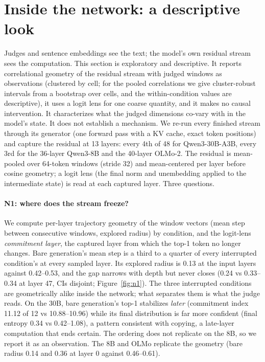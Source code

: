 \section{Inside the network: a descriptive look}
\label{sec:network}

Judges and sentence embeddings see the text; the model's own residual stream
sees the computation. This section is exploratory and descriptive. It
reports correlational geometry of the residual stream with judged windows as
observations (clustered by cell; for the pooled correlations we give
cluster-robust intervals from a bootstrap over cells, and the
within-condition values are descriptive), it uses a logit lens for one
coarse quantity, and it makes no causal intervention. It characterizes what
the judged dimensions co-vary with in the model's state. It does not
establish a mechanism. We re-run every finished stream through its generator
(one forward pass with a KV cache, exact token positions) and capture the
residual at 13 layers: every 4th of 48 for Qwen3-30B-A3B, every 3rd for the
36-layer Qwen3-8B and the 40-layer OLMo-2. The residual is mean-pooled over
64-token windows (stride 32) and mean-centered per layer before cosine
geometry; a logit lens (the final norm and unembedding applied to the
intermediate state) is read at each captured layer. Three questions.

\paragraph{N1: where does the stream freeze?} We compute per-layer
trajectory geometry of the window vectors (mean step between consecutive
windows, explored radius) by condition, and the logit-lens \emph{commitment
layer}, the captured layer from which the top-1 token no longer changes.
Bare generation's mean step is a third to a quarter of every interrupted
condition's at every sampled layer. Its explored radius is 0.13 at the input
layers against 0.42--0.53, and the gap narrows with depth but never closes
(0.24 vs 0.33--0.34 at layer 47, CIs disjoint; Figure~\ref{fig:n1}). The
three interrupted conditions are geometrically alike inside the network;
what separates them is what the judge reads. On the 30B, bare generation's
top-1 stabilizes \emph{later} (commitment index 11.12  of 12
vs 10.88--10.96) while its final distribution is far more confident (final
entropy 0.34 vs 0.42--1.08), a pattern consistent with copying, a late-layer
computation that ends certain. The ordering does not replicate on the 8B, so
we report it as an observation. The 8B and OLMo replicate the geometry (bare
radius 0.14 and 0.36 at layer 0 against 0.46--0.61).

